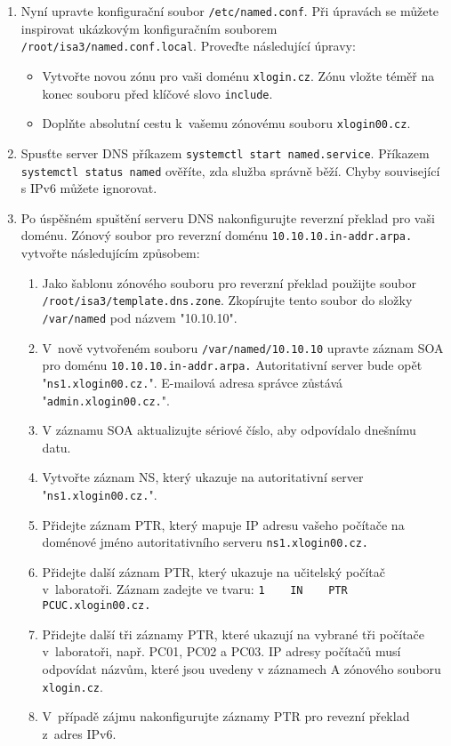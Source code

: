 \documentclass[a4paper,11pt]{article}
\begin{document}
\begin{enumerate}
  \item Nyní upravte konfigurační soubor {\tt /etc/named.conf}. Při úpravách se můžete inspirovat ukázkovým konfiguračním souborem {\tt /root/isa3/named.conf.local}. Proveďte následující úpravy:
    \begin{itemize}
      \item Vytvořte novou zónu pro vaši doménu {\tt xlogin.cz}. Zónu vložte téměř na konec souboru před klíčové slovo {\tt include}.
      \item Doplňte absolutní cestu k~vašemu zónovému souboru \texttt{xlogin00.cz}.
    \end{itemize}
  \item Spusťte server DNS příkazem {\tt systemctl start named.service}. Příkazem {\tt systemctl status named} ověříte, zda služba správně běží. Chyby související s IPv6 můžete ignorovat.
  
  \item Po úspěšném spuštění serveru DNS nakonfigurujte reverzní překlad pro vaši doménu. Zónový soubor pro reverzní doménu {\tt 10.10.10.in-addr.arpa.} vytvořte následujícím způsobem:
    \begin{enumerate}
      \item Jako šablonu zónového souboru pro reverzní překlad použijte soubor {\tt /root/isa3/temp\-late.dns.zone}.
            Zkopírujte tento soubor do složky {\tt /var/named} pod názvem "10.10.10".
      \item V~nově vytvořeném souboru {\tt /var/named/10.10.10} upravte záznam SOA pro doménu {\tt 10.10.10.in-addr.arpa.} Autoritativní server bude opět "{\tt ns1.xlogin00.cz.}"\rm. E-mailová adresa správce zůstává "{\tt admin.xlogin00.cz.}"\rm.
      \item V záznamu SOA aktualizujte sériové číslo, aby odpovídalo dnešnímu datu.
      \item Vytvořte záznam NS, který ukazuje na autoritativní server "{\tt ns1.xlogin00.cz.}"\rm.
      \item Přidejte záznam PTR, který mapuje IP adresu vašeho počítače na doménové jméno autoritativního serveru {\tt ns1.xlogin00.cz.}
      \item Přidejte další záznam PTR, který ukazuje na učitelský počítač v~laboratoři. Záznam zadejte ve tvaru:
            \verb|1    IN    PTR    PCUC.xlogin00.cz.|
      \item Přidejte další tři záznamy PTR, které ukazují na vybrané tři počítače v~laboratoři, např. PC01, PC02 a PC03. IP adresy počítačů musí odpovídat názvům, které jsou uvedeny v záznamech A zónového souboru {\tt xlogin.cz}.
      \item V~případě zájmu nakonfigurujte záznamy PTR pro revezní překlad z~adres IPv6.
    \end{enumerate} 


\end{enumerate}
\end{document}
